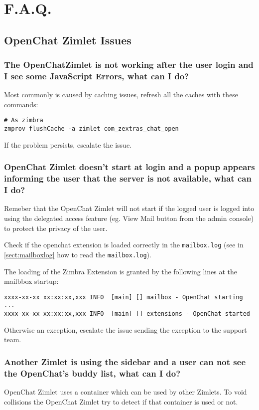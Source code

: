 \section{F.A.Q.}
\label{sect:faq}

    \subsection[Zimlet Issues]{OpenChat Zimlet Issues}

    \subsubsection{The OpenChatZimlet is not working after the user login and I see some JavaScript Errors, what can I do?}
        Most commonly is caused by caching issues, refresh all the caches with these commands:
        \begin{verbatim}
# As zimbra
zmprov flushCache -a zimlet com_zextras_chat_open
        \end{verbatim}
        If the problem persists, escalate the issue.

    \subsubsection{OpenChat Zimlet doesn’t start at login and a popup appears informing the user that the server is not
    available, what can I do?}
        \begin{info}
            Remeber that the OpenChat Zimlet will not start if the logged user is logged into using the delegated access
            feature (eg. View Mail button from the admin console) to protect the privacy of the user.
        \end{info}

        Check if the openchat extension is loaded correctly in the \verb+mailbox.log+ (see in \autoref{sect:mailboxlog}
        how to read the \verb+mailbox.log+).

        The loading of the Zimbra Extension is granted by the following lines at the mailbbox startup:
        \begin{verbatim}
xxxx-xx-xx xx:xx:xx,xxx INFO  [main] [] mailbox - OpenChat starting ...
xxxx-xx-xx xx:xx:xx,xxx INFO  [main] [] extensions - OpenChat started
        \end{verbatim}
        Otherwise an exception, escalate the issue sending the exception to the support team.

    \subsubsection{Another Zimlet is using the sidebar and a user can not see the OpenChat's buddy list, what can I do?}
        OpenChat Zimlet uses a container which can be used by other Zimlets. To void collisions the OpenChat Zimlet try
        to detect if that container is used or not.

